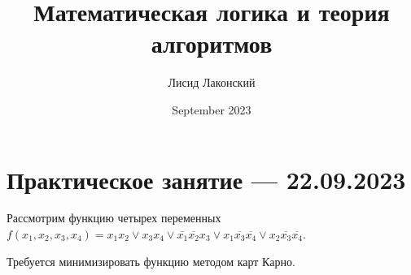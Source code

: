 \documentclass{article}
\title{Математическая логика и теория алгоритмов}
\author{Лисид Лаконский}
\date{September 2023}
\begin{document}
\raggedright

\maketitle

\tableofcontents
\pagebreak

\section{Практическое занятие — 22.09.2023}

Рассмотрим функцию четырех переменных $f(x_1, x_2, x_3, x_4) = x_1 x_2 \lor x_3 x_4 \lor \overline{x_1} \overline{x_2} x_3 \lor x_1 \overline{x_3} \overline{x_4} \lor x_2 \overline{x_3} \overline{x_4}$.

Требуется минимизировать функцию методом карт Карно.
\end{document}
